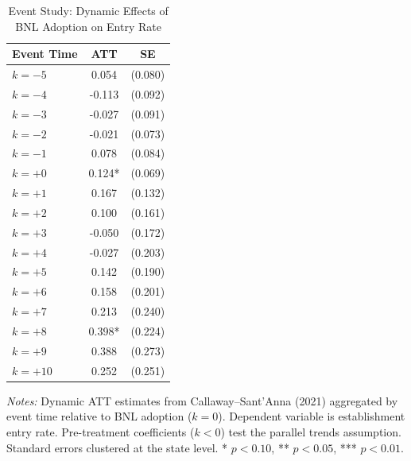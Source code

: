 \begin{table}[H]
\centering
\caption{Event Study: Dynamic Effects of BNL Adoption on Entry Rate}
\label{tab:eventstudy}
\begin{threeparttable}
\begin{tabular}{lcc}
\toprule
Event Time & ATT & SE \\
\midrule
$k = -5$ & 0.054 & (0.080) \\
$k = -4$ & -0.113 & (0.092) \\
$k = -3$ & -0.027 & (0.091) \\
$k = -2$ & -0.021 & (0.073) \\
$k = -1$ & 0.078 & (0.084) \\
$k = +0$ & 0.124* & (0.069) \\
$k = +1$ & 0.167 & (0.132) \\
$k = +2$ & 0.100 & (0.161) \\
$k = +3$ & -0.050 & (0.172) \\
$k = +4$ & -0.027 & (0.203) \\
$k = +5$ & 0.142 & (0.190) \\
$k = +6$ & 0.158 & (0.201) \\
$k = +7$ & 0.213 & (0.240) \\
$k = +8$ & 0.398* & (0.224) \\
$k = +9$ & 0.388 & (0.273) \\
$k = +10$ & 0.252 & (0.251) \\
\bottomrule
\end{tabular}
\begin{tablenotes}[flushleft]
\small
\item \textit{Notes:} Dynamic ATT estimates from Callaway--Sant'Anna (2021) aggregated by event time relative to BNL adoption ($k=0$). Dependent variable is establishment entry rate. Pre-treatment coefficients ($k < 0$) test the parallel trends assumption. Standard errors clustered at the state level. * $p<0.10$, ** $p<0.05$, *** $p<0.01$.
\end{tablenotes}
\end{threeparttable}
\end{table}
